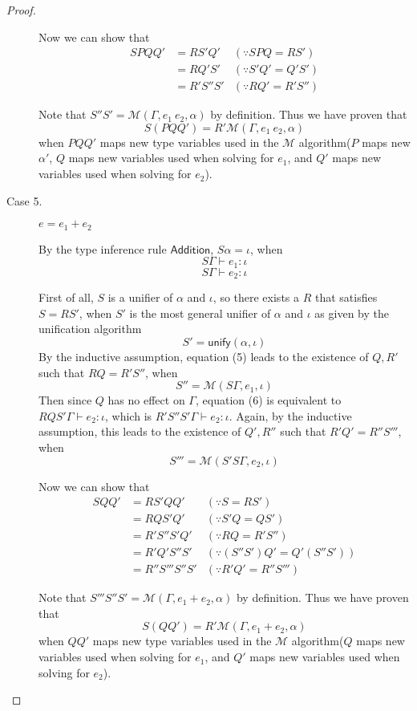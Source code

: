 \documentclass{article}
\begin{document}
\begin{proof}
\begin{description}
Now we can show that
\begin{align}
    SPQQ' &= RS'Q' &(\because SPQ = RS')\nonumber\\
        &= RQ'S' &(\because S'Q' = Q'S')\nonumber\\
        &= R'S''S' &(\because RQ' = R'S'')\nonumber
\end{align}

Note that $S''S' = \mathcal{M}(\Gamma, e_1 \: e_2, \alpha)$ by definition. Thus we have proven that \[S(PQQ') = R'\mathcal{M}(\Gamma, e_1 \: e_2, \alpha)\] when $PQQ'$ maps new type variables used in the $\mathcal{M}$ algorithm($P$ maps new $\alpha'$, $Q$ maps new variables used when solving for $e_1$, and $Q'$ maps new variables used when solving for $e_2$).

\item[Case 5.] $e = e_1 + e_2$

By the type inference rule $\mathsf{Addition}$, $S\alpha = \iota$, when 
\begin{equation} 
    S\Gamma \vdash e_1 : \iota
\end{equation}
\begin{equation}
    S\Gamma \vdash e_2 : \iota
\end{equation}

First of all, $S$ is a unifier of $\alpha$ and $\iota$, so there exists a $R$ that satisfies $S = RS'$, when $S'$ is the most general unifier of $\alpha$ and $\iota$ as given by the unification algorithm \[S' = \mathsf{unify}(\alpha, \iota)\] By the inductive assumption, equation (5) leads to the existence of $Q, R'$ such that $RQ = R'S''$, when \[S'' = \mathcal{M}(S\Gamma, e_1, \iota)\] Then since $Q$ has no effect on $\Gamma$, equation (6) is equivalent to $RQS'\Gamma \vdash e_2 : \iota$, which is $R'S''S'\Gamma \vdash e_2 : \iota$. Again, by the inductive assumption, this leads to the existence of $Q', R''$ such that $R'Q' = R''S'''$, when \[S''' = \mathcal{M}(S'S\Gamma, e_2, \iota)\]

Now we can show that
\begin{align}
    SQQ' &= RS'QQ' &(\because S = RS')\nonumber\\
        &= RQS'Q' &(\because S'Q = QS')\nonumber\\
        &= R'S''S'Q' &(\because RQ = R'S'')\nonumber\\
        &= R'Q'S''S' &(\because (S''S')Q' = Q'(S''S'))\nonumber\\
        &= R''S'''S''S' &(\because R'Q' = R''S''')\nonumber
\end{align}

Note that $S'''S''S' = \mathcal{M}(\Gamma, e_1 + e_2, \alpha)$ by definition. Thus we have proven that \[S(QQ') = R'\mathcal{M}(\Gamma, e_1 + e_2, \alpha)\] when $QQ'$ maps new type variables used in the $\mathcal{M}$ algorithm($Q$ maps new variables used when solving for $e_1$, and $Q'$ maps new variables used when solving for $e_2$).

\end{description}
\end{proof}
\end{document}
